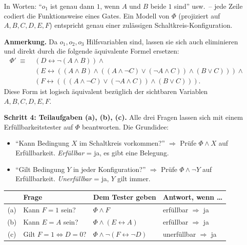 \documentclass[a4paper,12pt]{article}
\begin{document}
In Worten: ``$o_1$ ist genau dann $1$, wenn $A$ und $B$ beide $1$
sind'' usw.\ -- jede Zeile codiert die Funktionsweise eines Gates.
Ein Modell von $\Phi$ (projiziert auf $A, B, C, D, E, F$) entspricht
genau einer zul\"assigen Schaltkreis-Konfiguration.

\medskip
{\small
\textbf{Anmerkung.} Da $o_1, o_2, o_3$ Hilfsvariablen sind, lassen
sie sich auch eliminieren und direkt durch die folgende
\"aquivalente Formel ersetzen:
\begin{align*}
\Phi' \;\equiv\; & (D \leftrightarrow \neg(A \wedge B)) \wedge {} \\
& (E \leftrightarrow ((A \wedge B) \wedge ((A \wedge \neg C) \vee (\neg A \wedge C)) \wedge (B \vee C))) \wedge {} \\
& (F \leftrightarrow (((A \wedge \neg C) \vee (\neg A \wedge C)) \wedge (B \vee C))).
\end{align*}
Diese Form ist logisch \"aquivalent bez\"uglich der sichtbaren
Variablen $A,B,C,D,E,F$.
}

\medskip
\textbf{Schritt 4: Teilaufgaben (a), (b), (c).}
Alle drei Fragen lassen sich mit einem Erf\"ullbarkeitstester auf
$\Phi$ beantworten. Die Grundidee:

\begin{itemize}[nosep]
\item ``Kann Bedingung $X$ im Schaltkreis vorkommen?'' $\Rightarrow$
      Pr\"ufe $\Phi \wedge X$ auf Erf\"ullbarkeit.
      \emph{Erf\"ullbar} = ja, es gibt eine Belegung.
\item ``Gilt Bedingung $Y$ in jeder Konfiguration?'' $\Rightarrow$
      Pr\"ufe $\Phi \wedge \neg Y$ auf Erf\"ullbarkeit.
      \emph{Unerf\"ullbar} = ja, $Y$ gilt immer.
\end{itemize}

\smallskip
\begin{center}
\renewcommand{\arraystretch}{1.4}
\begin{tabular}{c|l|l|l}
\toprule
 & \textbf{Frage} & \textbf{Dem Tester geben} & \textbf{Antwort, wenn \ldots} \\
\midrule
(a) & Kann $F = 1$ sein?
    & $\Phi \wedge F$
    & erf\"ullbar $\Rightarrow$ ja \\
(b) & Kann $E = A$ sein?
    & $\Phi \wedge (E \leftrightarrow A)$
    & erf\"ullbar $\Rightarrow$ ja \\
(c) & Gilt $F = 1 \Leftrightarrow D = 0$?
    & $\Phi \wedge \neg(F \leftrightarrow \neg D)$
    & unerf\"ullbar $\Rightarrow$ ja \\
\bottomrule
\end{tabular}
\end{center}
\end{document}
